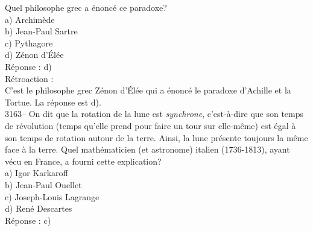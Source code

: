 \documentclass[letterpaper, 12pt]{article}
\begin{document}
Quel philosophe grec a \'enonc\'e ce paradoxe?\\

a) Archim\`ede\\
b) Jean-Paul Sartre\\
c) Pythagore\\
d) Z\'enon d'\'El\'ee\\

R\'eponse : d)\\

R\'etroaction :\\
C'est le philosophe grec Z\'enon d'\'El\'ee qui a \'enonc\'e le paradoxe d'Achille et la Tortue. La r\'eponse est d).\\



3163-- On dit que la rotation de la lune est \emph{synchrone}, c'est-\`a-dire que son temps de r\'evolution (temps qu'elle prend pour faire un tour sur elle-m\^eme) est \'egal \`a son temps de rotation autour de la terre. Ainsi, la lune pr\'esente toujours la m\^eme face \`a la terre. Quel math\'ematicien (et astronome) italien (1736-1813), ayant v\'ecu en France, a fourni cette explication?\\

a) Igor Karkaroff\\
b) Jean-Paul Ouellet\\
c) Joseph-Louis Lagrange\\
d) Ren\'e Descartes\\

R\'eponse : c)\\
\end{document}
